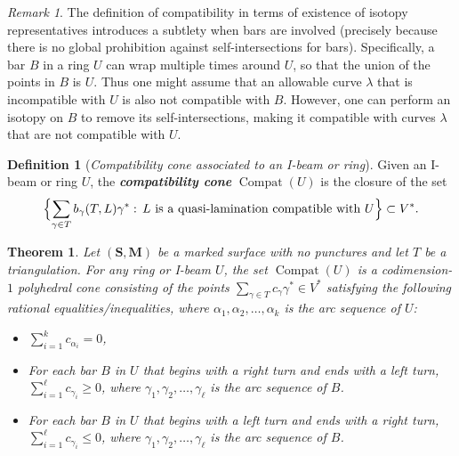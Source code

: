 \documentclass{amsart}
\newtheorem{theorem}[proposition]{Theorem}
\theoremstyle{definition}
\newtheorem{definition}[proposition]{Definition}
\theoremstyle{remark}
\newtheorem{remark}[proposition]{Remark}
\numberwithin{equation}{section}
\newcommand{\newword}[1]{\textbf{\emph{#1}}}
\newcommand{\settt}[1]{{\Bigl\lbrace #1 \Bigr\rbrace}}
\newcommand{\0}{{\mathbf{0}}}
\newcommand{\M}{\mathbf{M}}
\renewcommand{\S}{\mathbf{S}}
\newcommand{\Compat}{\operatorname{Compat}}
\begin{document}
\begin{remark}\label{subtlety}
The definition of compatibility in terms of existence of isotopy representatives introduces a subtlety when bars are involved (precisely because there is no global prohibition against self-intersections for bars).
Specifically, a bar $B$ in a ring $U$ can wrap multiple times around $U$, so that the union of the points in $B$ is $U$.
Thus one might assume that an allowable curve $\lambda$ that is incompatible with $U$ is also not compatible with $B$.
However, one can perform an isotopy on $B$ to remove its self-intersections, making it compatible with curves $\lambda$ that are not compatible with $U$.
\end{remark}

\begin{definition}[\emph{Compatibility cone associated to an I-beam or ring}]  
Given an I-beam or ring $U$, the \newword{compatibility cone} $\Compat(U)$ is the closure of the set 
\[\settt{\sum_{\gamma\in T}b_\gamma(T,L)\gamma^*:\,L\text{ is a quasi-lamination compatible with }U}\subset V^*.\]	
\end{definition}

\begin{theorem}\label{wall thm no punct}  
Let $(\S,\M)$ be a marked surface \emph{with no punctures} and let $T$ be a triangulation.
For any ring or I-beam $U$, the set $\Compat(U)$ is a codimension-$1$ polyhedral cone consisting of the points $\sum_{\gamma\in T}c_\gamma\gamma^*\in V^*$ satisfying the following rational equalities/inequalities, where  $\alpha_1, \alpha_2,\ldots,\alpha_k$ is the arc sequence of $U$:
\begin{itemize}
\item  $\sum_{i=1}^kc_{\alpha_i}=0$, 
\item For each bar $B$ in $U$ that begins with a right turn and ends with a left turn, $\sum_{i=1}^\ell c_{\gamma_i} \geq 0$, where $\gamma_1, \gamma_2,\ldots,\gamma_\ell$ is the arc sequence of $B$.
\item For each bar $B$ in $U$ that begins with a left turn and ends with a right turn, $\sum_{i=1}^\ell c_{\gamma_i} \leq 0$, where $\gamma_1, \gamma_2,\ldots,\gamma_\ell$ is the arc sequence of $B$.
\end{itemize}
\end{theorem}
\end{document}
